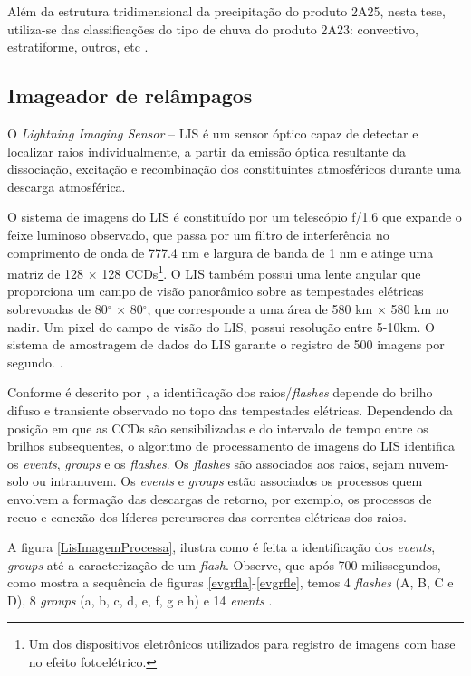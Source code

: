 Além da estrutura tridimensional da precipitação do produto 2A25, nesta tese, utiliza-se das classificações do tipo de chuva do produto 2A23: convectivo, estratiforme, outros, etc \cite{2A25,PRv7}.
      

\subsection{Imageador de relâmpagos}

O \textit{Lightning Imaging Sensor} -- LIS  é um sensor óptico capaz de detectar e localizar raios individualmente, a partir da emissão óptica resultante da dissociação, excitação e recombinação dos constituintes atmosféricos durante uma descarga atmosférica. 

O sistema de imagens do LIS é constituído por um telescópio f/1.6 que expande o feixe luminoso observado, que passa por um filtro de interferência no comprimento de onda de 777.4 nm e largura de banda de 1 nm e atinge uma matriz de 128 $\times$ 128 CCDs\footnote{Um dos dispositivos eletrônicos utilizados para registro de imagens com base no efeito fotoelétrico.}. O LIS também possui uma lente angular que proporciona um campo de visão panorâmico sobre as tempestades elétricas sobrevoadas de 80$^{\circ}$ $\times$ 80$^{\circ}$, que corresponde a uma área de 580 km $\times$ 580 km no nadir. Um pixel do campo de visão do LIS, possui resolução entre 5-10km. O sistema de amostragem de dados do LIS garante o registro de 500 imagens por segundo. \cite{christian2000LISalgorithm,boccippio1996science,trmmhandbook}. 

Conforme é descrito por , a identificação dos raios/\textit{flashes} depende do brilho difuso e transiente observado no topo das tempestades elétricas. Dependendo da posição em que as CCDs são sensibilizadas e do intervalo de tempo entre os brilhos subsequentes, o algoritmo de processamento de imagens do LIS identifica os \textit{events}, \textit{groups} e os \textit{flashes}. Os \textit{flashes} são associados aos raios, sejam nuvem-solo ou intranuvem. Os \textit{events} e \textit{groups} estão associados os processos quem envolvem a formação das descargas de retorno, por exemplo, os processos de recuo e conexão dos líderes percursores das correntes elétricas dos raios.  

A figura \ref{LisImagemProcessa}, ilustra como é feita a identificação dos  \textit{events}, \textit{groups} até a caracterização de um \textit{flash}. Observe, que após 700 milissegundos, como mostra a sequência de figuras \ref{evgrfla}-\ref{evgrfle}, temos 4 \textit{flashes} (A, B, C e D),  8 \textit{groups} (a, b, c, d, e, f, g e h) e 14 \textit{events} \cite{christian2000LISalgorithm}.


